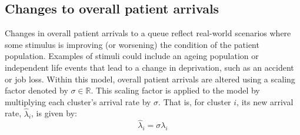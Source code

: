 \subsection{Changes to overall patient arrivals}\label{subsec:arrivals}

Changes in overall patient arrivals to a queue reflect real-world scenarios
where some stimulus is improving (or worsening) the condition of the patient
population. Examples of stimuli could include an ageing population or
independent life events that lead to a change in deprivation, such as an
accident or job loss. Within this model, overall patient arrivals are altered
using a scaling factor denoted by \(\sigma\in\mathbb{R}\). This scaling factor
is applied to the model by multiplying each cluster's arrival rate by
\(\sigma\). That is, for cluster \(i\), its new arrival rate, \(\hat\lambda_i\),
is given by:
\begin{equation}\label{eq:lambda}
    \hat\lambda_{i} = \sigma\lambda_i
\end{equation}

